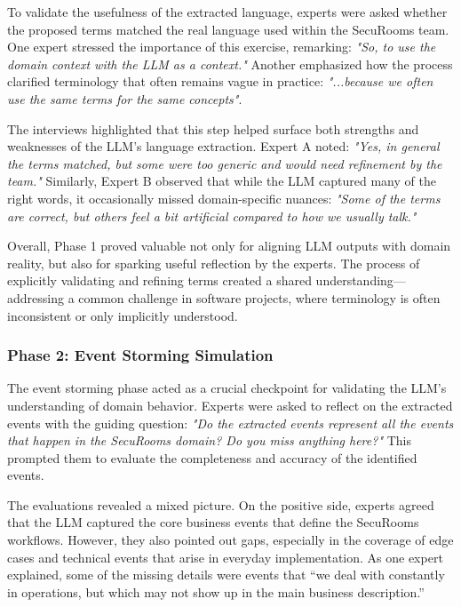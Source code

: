 To validate the usefulness of the extracted language, experts were asked whether the proposed terms matched the real language used within the SecuRooms team. One expert stressed the importance of this exercise, remarking: \textit{"So, to use the domain context with the LLM as a context."} Another emphasized how the process clarified terminology that often remains vague in practice: \textit{"...because we often use the same terms for the same concepts"}.  

The interviews highlighted that this step helped surface both strengths and weaknesses of the LLM's language extraction. Expert A noted: \textit{"Yes, in general the terms matched, but some were too generic and would need refinement by the team."} Similarly, Expert B observed that while the LLM captured many of the right words, it occasionally missed domain-specific nuances: \textit{"Some of the terms are correct, but others feel a bit artificial compared to how we usually talk."}  

Overall, Phase 1 proved valuable not only for aligning LLM outputs with domain reality, but also for sparking useful reflection by the experts. The process of explicitly validating and refining terms created a shared understanding—addressing a common challenge in software projects, where terminology is often inconsistent or only implicitly understood. 

\subsubsection{Phase 2: Event Storming Simulation}
The event storming phase acted as a crucial checkpoint for validating the LLM's understanding of domain behavior. Experts were asked to reflect on the extracted events with the guiding question: \textit{"Do the extracted events represent all the events that happen in the SecuRooms domain? Do you miss anything here?"} This prompted them to evaluate the completeness and accuracy of the identified events.  

The evaluations revealed a mixed picture. On the positive side, experts agreed that the LLM captured the core business events that define the SecuRooms workflows. However, they also pointed out gaps, especially in the coverage of edge cases and technical events that arise in everyday implementation. As one expert explained, some of the missing details were events that “we deal with constantly in operations, but which may not show up in the main business description.”  

